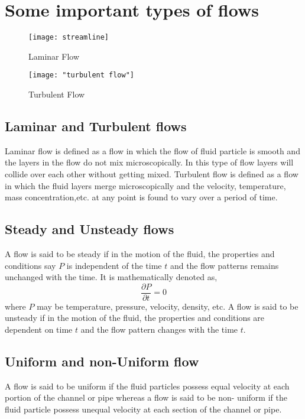 \documentclass[14pt,one side, a4paper]{extbook}
\begin{document}
	\section{Some important types of flows}	
	\begin{figure}[ht]
		\centering
		\texttt{[image: streamline]}
		\caption{ Laminar Flow}
		\label{fig:streamline}
	\end{figure}
	\begin{figure}[ht]
		\centering
		\texttt{[image: "turbulent flow"]}
		\caption{Turbulent Flow}
		\label{fig:turbulent-flow}
	\end{figure}
	
	\subsection{Laminar and Turbulent flows} Laminar flow is defined as a flow in which the flow of fluid particle is smooth and the layers in the flow do not mix microscopically. In this type of flow layers will collide over each other without getting mixed. Turbulent flow is defined as a flow in which the fluid layers merge microscopically and the velocity, temperature, mass concentration,etc.  at any point is found to vary over a period of time.
	\subsection{Steady\hspace*{0.5cm} and\hspace*{0.5cm} Unsteady\hspace*{0.5cm} flows}
	 A \hspace*{0.2cm}flow is \hspace*{0.2cm}said to be steady if in the motion of the fluid, the properties and conditions say $P$ is independent of the time $t$ and the flow patterns remains unchanged with the time. It is mathematically denoted as,
	\begin{equation*}
		 \frac{\partial{P}}{\partial{t}}=0
	\end{equation*}
		 where $P$ may be temperature, pressure, velocity, density, etc.
	A flow is said to be unsteady if in the motion of the fluid, the properties and conditions are dependent on time $t$ and the flow pattern changes with the time $t$.
	\subsection{Uniform and non-Uniform flow} A flow is  said to be uniform if the fluid particles possess equal velocity at each portion of the channel or pipe whereas a flow is said to be non- uniform if the fluid particle possess unequal velocity at each section of the channel or pipe.
	 
\end{document}
